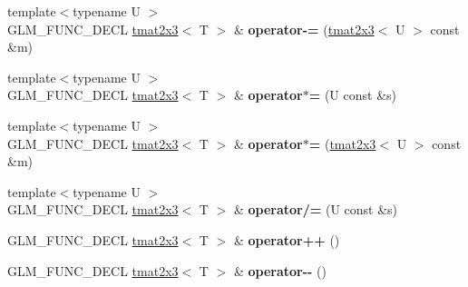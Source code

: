 \begin{DoxyCompactItemize}
\item 
\hypertarget{structglm_1_1detail_1_1tmat2x3_ac10b50f9f4a19ab14cf4f4063ff28284}{{\footnotesize template$<$typename U $>$ }\\G\-L\-M\-\_\-\-F\-U\-N\-C\-\_\-\-D\-E\-C\-L \hyperlink{structglm_1_1detail_1_1tmat2x3}{tmat2x3}$<$ T $>$ \& {\bfseries operator-\/=} (\hyperlink{structglm_1_1detail_1_1tmat2x3}{tmat2x3}$<$ U $>$ const \&m)}\label{structglm_1_1detail_1_1tmat2x3_ac10b50f9f4a19ab14cf4f4063ff28284}

\item 
\hypertarget{structglm_1_1detail_1_1tmat2x3_a36380d0c06b4770f2803d7bf890c4e3b}{{\footnotesize template$<$typename U $>$ }\\G\-L\-M\-\_\-\-F\-U\-N\-C\-\_\-\-D\-E\-C\-L \hyperlink{structglm_1_1detail_1_1tmat2x3}{tmat2x3}$<$ T $>$ \& {\bfseries operator$\ast$=} (U const \&s)}\label{structglm_1_1detail_1_1tmat2x3_a36380d0c06b4770f2803d7bf890c4e3b}

\item 
\hypertarget{structglm_1_1detail_1_1tmat2x3_ae7203d286817799431f77f54e7c3392d}{{\footnotesize template$<$typename U $>$ }\\G\-L\-M\-\_\-\-F\-U\-N\-C\-\_\-\-D\-E\-C\-L \hyperlink{structglm_1_1detail_1_1tmat2x3}{tmat2x3}$<$ T $>$ \& {\bfseries operator$\ast$=} (\hyperlink{structglm_1_1detail_1_1tmat2x3}{tmat2x3}$<$ U $>$ const \&m)}\label{structglm_1_1detail_1_1tmat2x3_ae7203d286817799431f77f54e7c3392d}

\item 
\hypertarget{structglm_1_1detail_1_1tmat2x3_a31472536b597683c09ea45d8f0c12bff}{{\footnotesize template$<$typename U $>$ }\\G\-L\-M\-\_\-\-F\-U\-N\-C\-\_\-\-D\-E\-C\-L \hyperlink{structglm_1_1detail_1_1tmat2x3}{tmat2x3}$<$ T $>$ \& {\bfseries operator/=} (U const \&s)}\label{structglm_1_1detail_1_1tmat2x3_a31472536b597683c09ea45d8f0c12bff}

\item 
\hypertarget{structglm_1_1detail_1_1tmat2x3_a871796f237c964f75c66db2ff7b107cf}{G\-L\-M\-\_\-\-F\-U\-N\-C\-\_\-\-D\-E\-C\-L \hyperlink{structglm_1_1detail_1_1tmat2x3}{tmat2x3}$<$ T $>$ \& {\bfseries operator++} ()}\label{structglm_1_1detail_1_1tmat2x3_a871796f237c964f75c66db2ff7b107cf}

\item 
\hypertarget{structglm_1_1detail_1_1tmat2x3_ab3ba2a1f3b1773fbd3c03aee24d47ece}{G\-L\-M\-\_\-\-F\-U\-N\-C\-\_\-\-D\-E\-C\-L \hyperlink{structglm_1_1detail_1_1tmat2x3}{tmat2x3}$<$ T $>$ \& {\bfseries operator-\/-\/} ()}\label{structglm_1_1detail_1_1tmat2x3_ab3ba2a1f3b1773fbd3c03aee24d47ece}


\end{DoxyCompactItemize}
